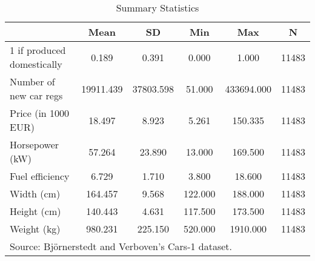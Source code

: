 \begin{table}[htbp]\centering
\def\sym#1{\ifmmode^{#1}\else\(^{#1}\)\fi}
\caption{Summary Statistics\label{tab1}}
\begin{tabular}{l*{1}{ccccc}}
\toprule
            &        Mean&          SD&         Min&         Max&           N\\
\midrule
1 if produced domestically&       0.189&       0.391&       0.000&       1.000&       11483\\
Number of new car regs&   19911.439&   37803.598&      51.000&  433694.000&       11483\\
Price (in 1000 EUR)&      18.497&       8.923&       5.261&     150.335&       11483\\
Horsepower (kW)&      57.264&      23.890&      13.000&     169.500&       11483\\
Fuel efficiency&       6.729&       1.710&       3.800&      18.600&       11483\\
Width (cm)  &     164.457&       9.568&     122.000&     188.000&       11483\\
Height (cm) &     140.443&       4.631&     117.500&     173.500&       11483\\
Weight (kg) &     980.231&     225.150&     520.000&    1910.000&       11483\\
\bottomrule
\multicolumn{6}{l}{\footnotesize Source: Björnerstedt and Verboven's Cars-1 dataset.}\\
\end{tabular}
\end{table}
